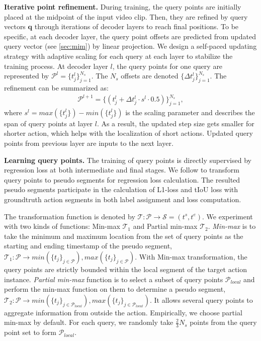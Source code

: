 \documentclass{article}
\renewcommand{\paragraph}[1]{\vspace{1.25mm}\noindent\textbf{#1}}
\begin{document}
\paragraph{Iterative point refinement.}
During training, the query points are initially placed at the midpoint of the input video clip. Then, they are refined by query vectors $\mathbf{q}$ through iterations of decoder layers to reach final positions. To be specific, at each decoder layer, the query point offsets are predicted from updated query vector (see \cref{sec:mim}) by linear projection. We design a self-paced updating strategy with adaptive scaling for each query at each layer to stabilize the training process. At decoder layer $l$, the query points for one query are represented by $\mathcal{P}^l = \{t_j^l\}_{j=1}^{N_s}$.  The $N_s$ offsets are denoted $\{\Delta t_j^l \}_{j=1}^{N_s}$. The refinement can be summarized as:
\begin{align}
    \mathcal{P}^{l+1} = \{ (t_j^l + \Delta t_j^l \cdot s^l \cdot 0.5 )\}_{j=1}^{N_s},
\end{align}
where $s^l = max(\{t^l_j\}) - min(\{t^l_j\})$ is the scaling parameter and describes the span of query points at layer $l$. As a result, the updated step size gets smaller for shorter action, which helps with the localization of short actions. Updated query points from previous layer are inputs to the next layer. 

\paragraph{Learning query points.} 
The training of query points is directly supervised by regression loss at both intermediate and final stages. We follow \cite{DBLP:conf/iccv/YangLHWL19} to transform query points to pseudo segments for regression loss calculation. The resulted pseudo segments participate in the calculation of L1-loss and tIoU loss with groundtruth action segments in both label assignment and loss computation. 

The transformation function is denoted by $\mathcal{T}: \mathcal{P} \rightarrow \mathcal{S} = (t^s, t^e)$. We experiment with two kinds of functions: Min-max $\mathcal{T}_1$ and Partial min-max $\mathcal{T}_2$.  {\em Min-max} is to take the minimum and maximum location from the set of query points as the starting and ending timestamp of the pseudo segment, $ \mathcal{T}_1:\mathcal{P} \rightarrow min(\{t_j\}_{j\in \mathcal{P}}), max(\{t_j\}_{j\in \mathcal{P}})$. With Min-max transformation, the query points are strictly bounded within the local segment of the target action instance. {\em Partial min-max} function is to select a subset of query points $\mathcal{P}_{local}$ and perform the min-max function on them to determine a pseudo segment, $\mathcal{T}_2: \mathcal{P} \rightarrow min(\{t_j\}_{j\in \mathcal{P}_{local}}), max(\{t_j\}_{j \in \mathcal{P}_{local}})$.
It allows several query points to aggregate information from outside the action. Empirically, we choose partial min-max by default. For each query, we randomly take $\frac{2}{3}N_s$ points from the query point set to form $\mathcal{P}_{local}$. 
\end{document}
